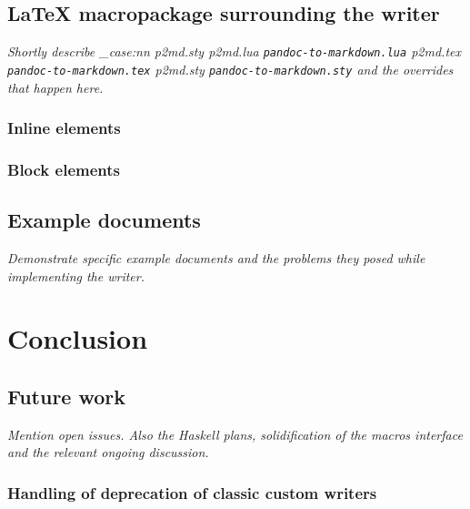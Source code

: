 \documentclass[
  digital,     %
  oneside,     %
  nosansbold,  %
  nocolorbold, %
  lof,         %
  nolot,       %
]{fithesis4}
\newcommand\file[1]
  {
    \str_case:nn
      { #1 }
      {
        { p2md.lua } { \texttt{pandoc\hyp{}to\hyp{}markdown.lua} }
        { p2md.tex } { \texttt{pandoc\hyp{}to\hyp{}markdown.tex} }
        { p2md.sty } { \texttt{pandoc\hyp{}to\hyp{}markdown.sty} }
      }
  }
\begin{document}
\section{\LaTeX{} macropackage surrounding the writer}
\emph{Shortly describe \file{p2md.sty} and the overrides that happen here.}
\subsection{Inline elements}
\subsection{Block elements}

\section{Example documents}
\emph{Demonstrate specific example documents and the problems they posed while implementing the writer. \label{fig:html-browsers-typeset} }

% 


\chapter{Conclusion}
\section{Future work}
\emph{Mention open issues. Also the Haskell plans, solidification of the macros interface and the relevant ongoing discussion.}

\subsection{Handling of deprecation of classic custom writers}
\end{document}
